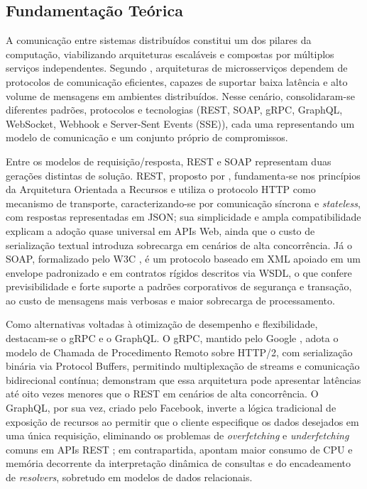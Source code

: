 \documentclass[a4paper,12pt]{article}
\begin{document}
\subsection{Fundamentação Teórica}

A comunicação entre sistemas distribuídos constitui um dos pilares da computação, viabilizando arquiteturas escaláveis e compostas por múltiplos serviços independentes. Segundo , arquiteturas de microsserviços dependem de protocolos de comunicação eficientes, capazes de suportar baixa latência e alto volume de mensagens em ambientes distribuídos. Nesse cenário, consolidaram-se diferentes padrões, protocolos e tecnologias (REST, SOAP, gRPC, GraphQL, WebSocket, Webhook e Server-Sent Events (SSE)), cada uma representando um modelo de comunicação e um conjunto próprio de compromissos.

Entre os modelos de requisição/resposta, REST e SOAP representam duas gerações distintas de solução. REST, proposto por , fundamenta-se nos princípios da Arquitetura Orientada a Recursos e utiliza o protocolo HTTP como mecanismo de transporte, caracterizando-se por comunicação síncrona e \textit{stateless}, com respostas representadas em JSON; sua simplicidade e ampla compatibilidade explicam a adoção quase universal em APIs Web, ainda que o custo de serialização textual introduza sobrecarga em cenários de alta concorrência. Já o SOAP, formalizado pelo W3C \cite{soap2007w3c}, é um protocolo baseado em XML apoiado em um envelope padronizado e em contratos rígidos descritos via WSDL, o que confere previsibilidade e forte suporte a padrões corporativos de segurança e transação, ao custo de mensagens mais verbosas e maior sobrecarga de processamento.

Como alternativas voltadas à otimização de desempenho e flexibilidade, destacam-se o gRPC e o GraphQL. O gRPC, mantido pelo Google \cite{grpcio}, adota o modelo de Chamada de Procedimento Remoto sobre HTTP/2, com serialização binária via Protocol Buffers, permitindo multiplexação de streams e comunicação bidirecional contínua;  demonstram que essa arquitetura pode apresentar latências até oito vezes menores que o REST em cenários de alta concorrência. O GraphQL, por sua vez, criado pelo Facebook, inverte a lógica tradicional de exposição de recursos ao permitir que o cliente especifique os dados desejados em uma única requisição, eliminando os problemas de \textit{overfetching} e \textit{underfetching} comuns em APIs REST \cite{ambasht}; em contrapartida,  apontam maior consumo de CPU e memória decorrente da interpretação dinâmica de consultas e do encadeamento de \textit{resolvers}, sobretudo em modelos de dados relacionais.
\end{document}
